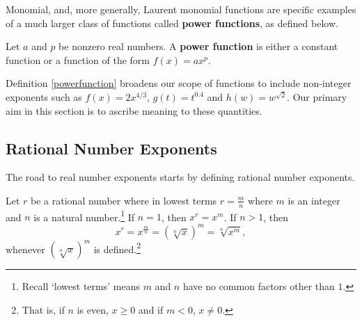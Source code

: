 \documentclass{ximera}
\begin{document}
	\author{Stitz-Zeager}




\setcounter{footnote}{0}

\label{PowerFunctions}

Monomial, and, more generally, Laurent monomial functions  are specific examples of a much larger class of functions called \textbf{power functions}, as defined below.


\begin{definition} \label{powerfunction}  Let $a$ and $p$ be nonzero real numbers.  A   \textbf{power function} is either a constant function or a  function of the form $f(x) = a x^p$.  

\end{definition}


Definition \ref{powerfunction} broadens our scope of functions to include non-integer exponents such as  $f(x) = 2x^{4/3}$, $g(t) = t^{0.4}$ and  $h(w) = w^{\sqrt{2}}$.   Our primary aim in this section is to ascribe meaning to these quantities.  

\subsection{Rational Number Exponents} 

The road to real number exponents starts by defining rational number exponents. 

\label{RationalExponents}

 


\begin{definition}  \label{rationalexponentdefna}  Let $r$  be a rational number where in lowest terms  $r = \frac{m}{n}$ where $m$ is an integer and $n$ is a natural number.\footnote{Recall `lowest terms' means $m$ and $n$ have no common factors other than $1$.}    If $n = 1$, then $x^{r} = x^{m}$.  If $n > 1$, then  \[ x^{r} = x^{\frac{m}{n}} = \left(\sqrt[n]{x}\right)^m   = \sqrt[n]{x^m}, \] whenever $\left(\sqrt[n]{x} \right)^m$ is defined.\footnote{That is, if $n$ is even, $x \geq 0$ and if $m<0$, $x \neq 0$.}

\end{definition}
\end{document}
